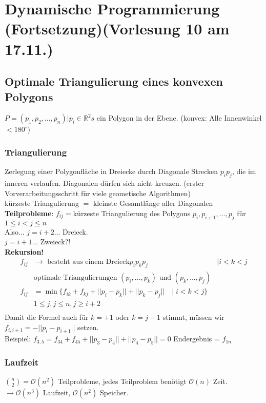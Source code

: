 \section{Dynamische Programmierung (Fortsetzung)\tiny (Vorlesung 10 am 17.11.)}

\subsection{Optimale Triangulierung eines konvexen Polygons}
$P=(p_1,p_2,...,p_n) | p_i \in \mathbb{R}^2s$ ein Polygon in der Ebene. (konvex: Alle Innenwinkel $<180^\circ$)\\
\subsubsection{Triangulierung}
Zerlegung einer Polygonfläche in Dreiecke durch Diagonale Strecken $p_i p_j$, die im inneren verlaufen. Diagonalen dürfen sich nicht kreuzen. (erster Vorverarbeitungsschritt für viele geometische Algorithmen)\\
kürzeste Triangulierung $=$ kleinste Gesamtlänge aller Diagonalen\\
\textbf{Teilprobleme}: $f_{ij}=$kürzeste Triangulierung des Polygons $p_i,p_{i+1},...,p_j$ für $1\leq i < j \leq n$\\
Also... $j = i +2$... Dreieck.\\
$j = i +1$... Zweieck?!\\
\textbf{Rekursion!}
\begin{align*}
f_{ij} &\rightarrow \text{ besteht aus einem Dreieck} p_i p_k p_j &| i < k < j\\
&\text{optimale Triangulierungen }(p_i,...,p_k) \text{ und } (p_k,...,p_j)\\
f_{ij} &= \min\{ f_{ik} + f_{kj} + ||p_i - p_k|| + ||p_k - p_j|| \quad | \; i<k<j \}\\
&1 \leq j, j \leq n, j \geq i +2\\
\end{align*}
Damit die Formel auch für $k =+1$ oder $k=j-1$ stimmt, müssen wir $f_{i,i+1} = - || p_i - p_{i+1} ||$ setzen.\\
Beispiel: $f_{3,5} = f_{34} + f_{45} + ||p_3-p_4||+||p_4-p_5|| = 0$
Endergebnis = $f_{1n}$
\subsubsection{Laufzeit}
$\binom{n}{2} = \mathcal{O}(n^2)$ Teilprobleme, jedes Teilproblem benötigt $\mathcal{O}(n)$ Zeit.\\ $\rightarrow \mathcal{O}(n^3)$ Laufzeit, $\mathcal{O}(n^2)$ Speicher. 
